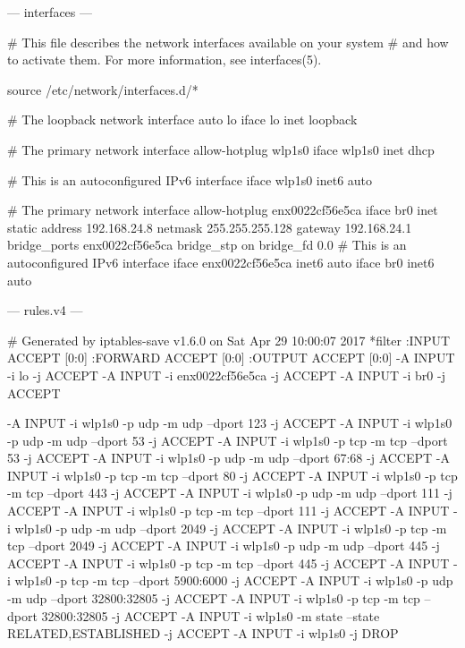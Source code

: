 \documentclass[mingoth,a4paper]{jsarticle}
\begin{document}
{{{{{{{{{{{{{{{{{--- interfaces ---
\begin{commandline}
# This file describes the network interfaces available on your system
# and how to activate them. For more information, see interfaces(5).

source /etc/network/interfaces.d/*

# The loopback network interface
auto lo
iface lo inet loopback

# The primary network interface
allow-hotplug wlp1s0
iface  wlp1s0 inet dhcp

# This is an autoconfigured IPv6 interface
iface wlp1s0 inet6 auto

# The primary network interface
allow-hotplug enx0022cf56e5ca
iface br0 inet static
   address 192.168.24.8
   netmask 255.255.255.128
   gateway 192.168.24.1
   bridge_ports enx0022cf56e5ca
   bridge_stp on
   bridge_fd 0.0
# This is an autoconfigured IPv6 interface
iface enx0022cf56e5ca inet6 auto
iface br0 inet6 auto
\end{commandline}
\clearpage

--- rules.v4 ---
\begin{commandline}
# Generated by iptables-save v1.6.0 on Sat Apr 29 10:00:07 2017
*filter
:INPUT ACCEPT [0:0]
:FORWARD ACCEPT [0:0]
:OUTPUT ACCEPT [0:0]
-A INPUT -i lo -j ACCEPT
-A INPUT -i enx0022cf56e5ca -j ACCEPT
-A INPUT -i br0 -j ACCEPT

-A INPUT -i wlp1s0 -p udp -m udp --dport 123 -j ACCEPT
-A INPUT -i wlp1s0 -p udp -m udp --dport 53 -j ACCEPT
-A INPUT -i wlp1s0 -p tcp -m tcp --dport 53 -j ACCEPT
-A INPUT -i wlp1s0 -p udp -m udp --dport 67:68 -j ACCEPT
-A INPUT -i wlp1s0 -p tcp -m tcp --dport 80 -j ACCEPT
-A INPUT -i wlp1s0 -p tcp -m tcp --dport 443 -j ACCEPT
-A INPUT -i wlp1s0 -p udp -m udp --dport 111 -j ACCEPT
-A INPUT -i wlp1s0 -p tcp -m tcp --dport 111 -j ACCEPT
-A INPUT -i wlp1s0 -p udp -m udp --dport 2049 -j ACCEPT
-A INPUT -i wlp1s0 -p tcp -m tcp --dport 2049 -j ACCEPT
-A INPUT -i wlp1s0 -p udp -m udp --dport 445 -j ACCEPT
-A INPUT -i wlp1s0 -p tcp -m tcp --dport 445 -j ACCEPT
-A INPUT -i wlp1s0 -p tcp -m tcp --dport 5900:6000 -j ACCEPT
-A INPUT -i wlp1s0 -p udp -m udp --dport 32800:32805 -j ACCEPT
-A INPUT -i wlp1s0 -p tcp -m tcp --dport 32800:32805 -j ACCEPT
-A INPUT -i wlp1s0 -m state --state RELATED,ESTABLISHED -j ACCEPT
-A INPUT -i wlp1s0 -j DROP



\end{commandline}}}}}}}}}}}}}}}}}}
\end{document}
